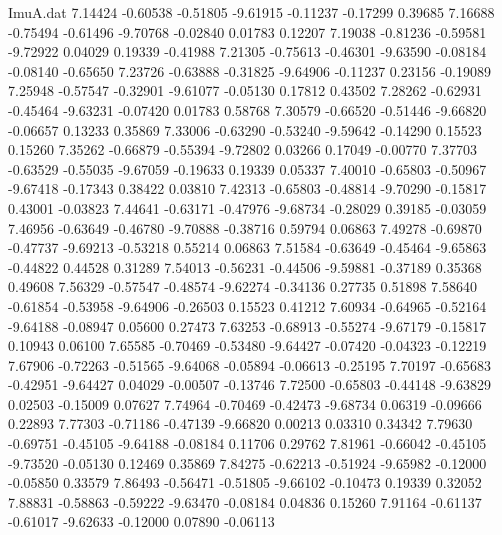 \begin{filecontents}{ImuA.dat}
   7.14424   -0.60538   -0.51805   -9.61915   -0.11237   -0.17299    0.39685
   7.16688   -0.75494   -0.61496   -9.70768   -0.02840    0.01783    0.12207
   7.19038   -0.81236   -0.59581   -9.72922    0.04029    0.19339   -0.41988
   7.21305   -0.75613   -0.46301   -9.63590   -0.08184   -0.08140   -0.65650
   7.23726   -0.63888   -0.31825   -9.64906   -0.11237    0.23156   -0.19089
   7.25948   -0.57547   -0.32901   -9.61077   -0.05130    0.17812    0.43502
   7.28262   -0.62931   -0.45464   -9.63231   -0.07420    0.01783    0.58768
   7.30579   -0.66520   -0.51446   -9.66820   -0.06657    0.13233    0.35869
   7.33006   -0.63290   -0.53240   -9.59642   -0.14290    0.15523    0.15260
   7.35262   -0.66879   -0.55394   -9.72802    0.03266    0.17049   -0.00770
   7.37703   -0.63529   -0.55035   -9.67059   -0.19633    0.19339    0.05337
   7.40010   -0.65803   -0.50967   -9.67418   -0.17343    0.38422    0.03810
   7.42313   -0.65803   -0.48814   -9.70290   -0.15817    0.43001   -0.03823
   7.44641   -0.63171   -0.47976   -9.68734   -0.28029    0.39185   -0.03059
   7.46956   -0.63649   -0.46780   -9.70888   -0.38716    0.59794    0.06863
   7.49278   -0.69870   -0.47737   -9.69213   -0.53218    0.55214    0.06863
   7.51584   -0.63649   -0.45464   -9.65863   -0.44822    0.44528    0.31289
   7.54013   -0.56231   -0.44506   -9.59881   -0.37189    0.35368    0.49608
   7.56329   -0.57547   -0.48574   -9.62274   -0.34136    0.27735    0.51898
   7.58640   -0.61854   -0.53958   -9.64906   -0.26503    0.15523    0.41212
   7.60934   -0.64965   -0.52164   -9.64188   -0.08947    0.05600    0.27473
   7.63253   -0.68913   -0.55274   -9.67179   -0.15817    0.10943    0.06100
   7.65585   -0.70469   -0.53480   -9.64427   -0.07420   -0.04323   -0.12219
   7.67906   -0.72263   -0.51565   -9.64068   -0.05894   -0.06613   -0.25195
   7.70197   -0.65683   -0.42951   -9.64427    0.04029   -0.00507   -0.13746
   7.72500   -0.65803   -0.44148   -9.63829    0.02503   -0.15009    0.07627
   7.74964   -0.70469   -0.42473   -9.68734    0.06319   -0.09666    0.22893
   7.77303   -0.71186   -0.47139   -9.66820    0.00213    0.03310    0.34342
   7.79630   -0.69751   -0.45105   -9.64188   -0.08184    0.11706    0.29762
   7.81961   -0.66042   -0.45105   -9.73520   -0.05130    0.12469    0.35869
   7.84275   -0.62213   -0.51924   -9.65982   -0.12000   -0.05850    0.33579
   7.86493   -0.56471   -0.51805   -9.66102   -0.10473    0.19339    0.32052
   7.88831   -0.58863   -0.59222   -9.63470   -0.08184    0.04836    0.15260
   7.91164   -0.61137   -0.61017   -9.62633   -0.12000    0.07890   -0.06113

\end{filecontents}
